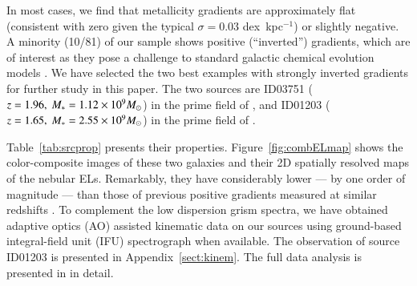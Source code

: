 In most cases, we find that metallicity gradients are approximately flat (\ie consistent with zero given the typical
$\sigma=0.03$ dex~kpc$^{-1}$) or slightly negative. A minority (10/81) of our sample shows positive (\ie ``inverted'') gradients,
which are of interest as they pose a challenge to standard galactic chemical evolution models 
\citep[\eg,][]{Molla:2005eq,Molla:2018em}.
We have selected the two best examples with strongly inverted gradients for further study in this paper.
The two sources are ID03751 ($z=1.96,~M_\ast=1.12\times10^9M_\odot$) in the prime field of \clsan, and ID01203
($z=1.65,~M_\ast=2.55\times10^9M_\odot$) in the prime field of \clba.

Table~\ref{tab:srcprop} presents their properties.
Figure~\ref{fig:combELmap} shows the color-composite \hst images of these two galaxies and their 2D spatially
resolved maps of the nebular ELs.
Remarkably, they have \Mstar considerably lower --- by one order of magnitude --- than those of previous positive gradients 
measured at similar redshifts \citep[see \eg,][]{Cresci:2010hr,Queyrel:2012hw,2014MNRAS.443.2695S,Metallicityevolutio:2014kg}.
To complement the low dispersion grism spectra, we have obtained adaptive optics (AO) assisted kinematic data on our sources using 
ground-based integral-field unit (IFU) spectrograph when available.
The observation of source ID01203 is presented in Appendix~\ref{sect:kinem}.
The full data analysis is presented in \citet{Hirtenstein:2018tn} in detail.



